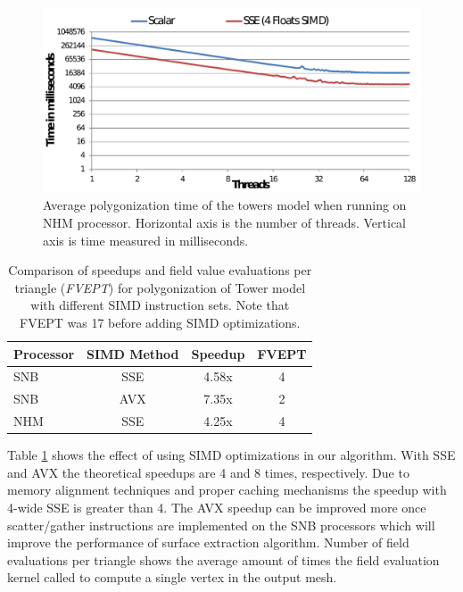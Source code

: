 \begin{figure}[htb]
  \centering
  \includegraphics[width = 1.0\linewidth]{figures/cpupoly/Perf_NHM.pdf}
  \caption{\label{fig:PerfXeonTower}
  {Average polygonization time of the towers model when running on NHM processor. Horizontal axis is the number of threads. 
  Vertical axis is time measured in milliseconds.}
}
\end{figure}

\begin{table}[H]
\begin{center}
\caption{\label{table:speedup}{Comparison of speedups and field value evaluations per triangle (\textit{FVEPT}) for polygonization of Tower model 
  with different SIMD instruction sets. Note that FVEPT was 17 before adding SIMD optimizations.}}
  \begin{tabular}{ | l | c | c | c | }
    \hline    
    Processor & SIMD Method & Speedup & FVEPT \\ \hline \hline    
    SNB & SSE & 4.58x & 4 \\ \hline
    SNB & AVX & 7.35x	& 2 \\ \hline
    NHM & SSE & 4.25x & 4 \\    
    \hline
  \end{tabular}
  	
\end{center}
\end{table}

Table \ref{table:speedup} shows the effect of using SIMD optimizations in our algorithm. With SSE and AVX the theoretical speedups are 4 and 8 times, 
respectively. Due to memory alignment techniques and proper caching mechanisms the speedup with 4-wide SSE is greater than 4. The AVX speedup can be 
improved more once scatter/gather instructions are implemented on the SNB processors which will improve the performance of surface extraction algorithm.
Number of field evaluations per triangle shows the average amount of times the field evaluation kernel called to compute a single vertex in the output mesh. 

